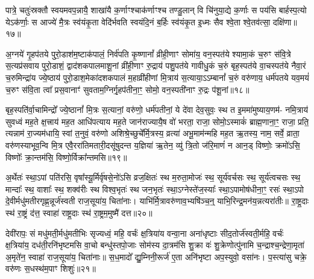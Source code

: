 पात्रे॒ चतुः॑स्रक्तौ स्वयमवप॒न्नायै॒ शाखा॑यै क॒र्णाꣳश्चाक॑र्णाꣳश्च तण्डु॒लान् वि चि॑नुया॒द्ये क॒र्णाः स पय॑सि बार्\mbox{}हस्प॒त्यो ये\-ऽक॑र्णाः॒ स आज्ये॑ मै॒त्रः स्व॑यंकृ॒ता वेदि॑र्भवति स्वयंदि॒नं ब॒र्\mbox{}हिः स्व॑यंकृ॒त इ॒ध्मः सैव श्वे॒ता श्वे॒तव॑त्सा॒ दक्षि॑णा॥१७॥

{}

अ॒ग्नये॑ गृ॒हप॑तये पुरो॒डाश॑म॒ष्टाक॑पालं॒ निर्व॑पति कृ॒ष्णानां᳚ व्रीही॒णाꣳ सोमा॑य॒ वन॒स्पत॑ये श्यामा॒कं च॒रुꣳ स॑वि॒त्रे स॒त्यप्र॑सवाय पुरो॒डाशं॒ द्वाद॑शकपालमाशू॒नां व्री॑ही॒णाꣳ रु॒द्राय॑ पशु॒पत॑ये गावीधु॒कं च॒रुं बृह॒स्पत॑ये वा॒चस्पत॑ये नैवा॒रं च॒रुमिन्द्रा॑य ज्ये॒ष्ठाय॑ पुरो॒डाश॒मेका॑दशकपालं म॒हाव्री॑हीणां मि॒त्राय॑ स॒त्याया॒\-ऽ\-ऽम्बानां᳚ च॒रुं वरु॑णाय॒ धर्म॑पतये यव॒मयं॑ च॒रुꣳ स॑वि॒ता त्वा᳚ प्रस॒वानाꣳ॑ सुवताम॒ग्निर्गृ॒हप॑तीना॒ꣳ॒ सोमो॒ वन॒स्पती॑नाꣳ रु॒द्रः प॑शू॒नां॥१८॥

बृह॒स्पति॑र्वा॒चामिन्द्रो᳚ ज्ये॒ष्ठानां᳚ मि॒त्रः स॒त्यानां॒ वरु॑णो॒ धर्म॑पतीनां॒ ये दे॑वा देव॒सुवः॒ स्थ त इ॒ममा॑मुष्याय॒णम॑- नमि॒त्राय॑ सुवध्वं मह॒ते क्ष॒त्त्राय॑ मह॒त आधि॑पत्याय मह॒ते जान॑राज्यायै॒ष वो॑ भरता॒ राजा॒ सोमो॒\-ऽस्माकं॑ ब्राह्म॒णाना॒ꣳ॒ राजा॒ प्रति॒ त्यन्नाम॑ रा॒ज्यम॑धायि॒ स्वां त॒नुवं॒ वरु॑णो अशिश्रे॒च्छुचे᳚र्मि॒त्रस्य॒ व्रत्या॑ अभू॒माम॑न्महि मह॒त ऋ॒तस्य॒ नाम॒ सर्वे॒ व्राता॒ वरु॑णस्याभूव॒न्वि मि॒त्र एवै॒ररा॑तिमतारी॒दसू॑षुदन्त य॒ज्ञिया॑ ऋ॒तेन॒ व्यु॑ त्रि॒तो ज॑रि॒माणं॑ न आन॒ड् विष्णोः॒ क्रमो॑\-ऽसि॒ विष्णोः᳚ क्रा॒न्तम॑सि॒ विष्णो॒र्विक्रा᳚न्तमसि॥१९॥

{\anuvakamend[{प॒शू॒नां व्राताः॒ पञ्च॑विꣳशतिश्च॥10॥}]}

अ॒र्थेतः॑ स्था॒\-ऽपां पति॑रसि॒ वृषा᳚स्यू॒र्मिर्वृ॑षसे॒नो॑\-ऽसि व्रज॒क्षितः॑ स्थ म॒रुता॒मोजः॑ स्थ॒ सूर्य॑वर्चसः स्थ॒ सूर्य॑त्वचसः स्थ॒ मान्दाः᳚ स्थ॒ वाशाः᳚ स्थ॒ शक्व॑रीः स्थ विश्व॒भृतः॑ स्थ जन॒भृतः॑ स्था॒\-ऽग्नेस्ते॑ज॒स्याः᳚ स्था॒\-ऽपामोष॑धीना॒ꣳ॒ रसः॑ स्था॒\-ऽपो दे॒वीर्मधु॑मतीरगृह्ण॒न्नूर्ज॑स्वती राज॒सूया॑य॒ चिता॑नाः। याभि॑र्मि॒त्रावरु॑णाव॒भ्यषि॑ञ्च॒न्॒ याभि॒रिन्द्र॒मन॑य॒न्नत्यरा॑तीः॥ रा॒ष्ट्र॒दाः स्थ॑ रा॒ष्ट्रं द॑त्त॒ स्वाहा॑ राष्ट्र॒दाः स्थ॑ रा॒ष्ट्रम॒मुष्मै॑ दत्त॥२०॥

{\anuvakamend[{अत्येका॑दश च॥11॥}]}

देवी॑रापः॒ सं मधु॑मती॒र्मधु॑मतीभिः सृज्यध्वं॒ महि॒ वर्चः॑ क्ष॒त्रिया॑य वन्वा॒ना अना॑धृष्टाः सीद॒तोर्ज॑स्वती॒र्महि॒ वर्चः॑ क्ष॒त्रिया॑य॒ दध॑ती॒रनि॑भृष्टमसि वा॒चो बन्धु॑स्तपो॒जाः सोम॑स्य दा॒त्रम॑सि शु॒क्रा वः॑ शु॒क्रेणोत्पु॑नामि च॒न्द्राश्च॒न्द्रेणा॒मृता॑ अ॒मृते॑न॒ स्वाहा॑ राज॒सूया॑य॒ चिता॑नाः॥ स॒ध॒मादो᳚ द्यु॒म्निनी॒रूर्ज॑ ए॒ता अनि॑भृष्टा अप॒स्युवो॒ वसा॑नः। प॒स्त्या॑सु चक्रे॒ वरु॑णः स॒धस्थ॑म॒पाꣳ शिशुः॑॥२१॥

